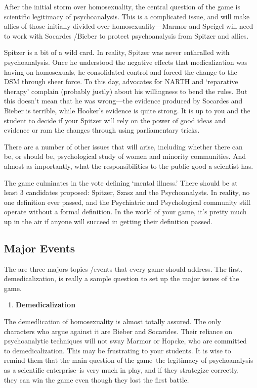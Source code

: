 After the initial storm over homosexuality, the central question of the game is scientific legitimacy of psychoanalysis. This is a complicated issue, and will make allies of those initially divided over homosexuality---Marmor and Speigel will need to work with Socardes \slash  Bieber to protect psychoanalysis from Spitzer and allies.

Spitzer is a bit of a wild card. In reality, Spitzer was never enthralled with psychoanalysis. Once he understood the negative effects that medicalization was having on homosexuals, he consolidated control and forced the change to the DSM through sheer force. To this day, advocates for NARTH and `reparative therapy' complain (probably justly) about his willingness to bend the rules. But this doesn't mean that he was wrong---the evidence produced by Socardes and Bieber is terrible, while Hooker's evidence is quite strong. It is up to you and the student to decide if your Spitzer will rely on the power of good ideas and evidence or ram the changes through using parliamentary tricks.

There are a number of other issues that will arise, including whether there can be, or should be, psychological study of women and minority communities. And almost as importantly, what the responsibilities to the public good a scientist has.

The game culminates in the vote defining `mental illness.' There should be at least 3 candidates proposed: Spitzer, Szasz and the Psychoanalysts. In reality, no one definition ever passed, and the Psychiatric and Psychological community still operate without a formal definition. In the world of your game, it's pretty much up in the air if anyone will succeed in getting their definition passed.

\subsection{Major Events}
\label{majorevents}

The are three majors topics \slash  events that every game should address. The first, demedicalization, is really a sample question to set up the major issues of the game.

\begin{enumerate}
\item \textbf{Demedicalization}

\end{enumerate}

The demedlication of homosexuality is almost totally assured. The only characters who argue against it are Bieber and Socarides. Their reliance on psychoanalytic techniques will not sway Marmor or Hopcke, who are committed to demedicalization. This may be frustrating to your students. It is wise to remind them that the main question of the game--the legitimacy of psychoanalysis as a scientific enterprise--is very much in play, and if they strategize correctly, they can win the game even though they lost the first battle.

